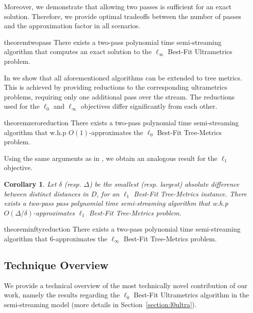 \documentclass{article}
\newtheorem{corollary}[theorem]{Corollary}
\begin{document}
Moreover, we demonstrate that allowing two passes is sufficient for an exact solution.
Therefore, we provide optimal tradeoffs between the number of passes and the approximation factor in all scenarios.

\begin{restatable}{theorem}{twopass}\label{theorem:twopassexact}
There exists a two-pass polynomial time semi-streaming algorithm that
computes an exact solution to the $\ell_\infty$ Best-Fit Ultrametrics problem.
\end{restatable}

In  we show that all aforementioned algorithms can be extended to tree metrics.
This is achieved by providing reductions to the corresponding ultrametrics problems, requiring only one additional pass over the stream.
The reductions used for the $\ell_0$ and $\ell_\infty$ objectives differ significantly from each other. 

\begin{restatable}{theorem}{zeroreduction}\label{theorem:best_tree_zero}
There exists a two-pass polynomial time semi-streaming algorithm that w.h.p $O(1)$-approximates the $\ell_0$ Best-Fit Tree-Metrics problem.
\end{restatable}

Using the same arguments as in , we obtain an analogous result for the $\ell_1$ objective.

\begin{corollary} Let $\delta$ (resp. $\Delta$) be the smallest (resp. largest) absolute difference between distinct distances in $D$, for an $\ell_1$ Best-Fit Tree-Metrics instance. There exists a two-pass pass polynomial time semi-streaming algorithm that w.h.p $O(\Delta/\delta)$-approximates $\ell_1$ Best-Fit Tree-Metrics problem.
\end{corollary}

\begin{restatable}{theorem}{inftyreduction}\label{theorem:best_tree_infty}
There exists a two-pass polynomial time semi-streaming algorithm that 6-approximates the $\ell_\infty$ Best-Fit Tree-Metrics problem.
\end{restatable}
 

\subsection{Technique Overview}
We provide a technical overview of the most technically novel contribution of our work, namely the results regarding the $\ell_0$ Best-Fit Ultrametrics algorithm in the semi-streaming model (more details in Section~\ref{section:l0ultra}).
\end{document}
